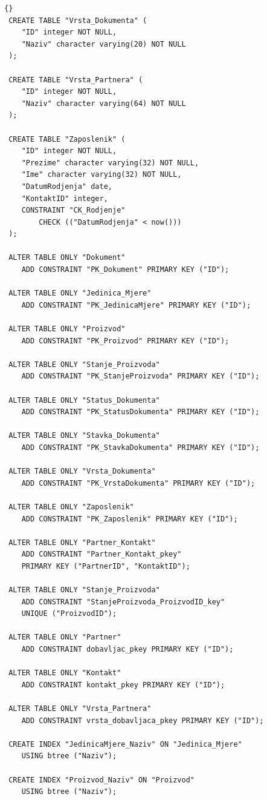 \documentclass[a4paper,12pt]{foi}
\begin{document}
\begin{lstlisting}[frame=tb]{}
 CREATE TABLE "Vrsta_Dokumenta" (
    "ID" integer NOT NULL,
    "Naziv" character varying(20) NOT NULL
 );
 
 CREATE TABLE "Vrsta_Partnera" (
    "ID" integer NOT NULL,
    "Naziv" character varying(64) NOT NULL
 );
 
 CREATE TABLE "Zaposlenik" (
    "ID" integer NOT NULL,
    "Prezime" character varying(32) NOT NULL,
    "Ime" character varying(32) NOT NULL,
    "DatumRodjenja" date,
    "KontaktID" integer,
    CONSTRAINT "CK_Rodjenje" 
    	CHECK (("DatumRodjenja" < now()))
 );
 
 ALTER TABLE ONLY "Dokument"
    ADD CONSTRAINT "PK_Dokument" PRIMARY KEY ("ID");

 ALTER TABLE ONLY "Jedinica_Mjere"
    ADD CONSTRAINT "PK_JedinicaMjere" PRIMARY KEY ("ID");

 ALTER TABLE ONLY "Proizvod"
    ADD CONSTRAINT "PK_Proizvod" PRIMARY KEY ("ID");

 ALTER TABLE ONLY "Stanje_Proizvoda"
    ADD CONSTRAINT "PK_StanjeProizvoda" PRIMARY KEY ("ID");

 ALTER TABLE ONLY "Status_Dokumenta"
    ADD CONSTRAINT "PK_StatusDokumenta" PRIMARY KEY ("ID");

 ALTER TABLE ONLY "Stavka_Dokumenta"
    ADD CONSTRAINT "PK_StavkaDokumenta" PRIMARY KEY ("ID");

 ALTER TABLE ONLY "Vrsta_Dokumenta"
    ADD CONSTRAINT "PK_VrstaDokumenta" PRIMARY KEY ("ID");

 ALTER TABLE ONLY "Zaposlenik"
    ADD CONSTRAINT "PK_Zaposlenik" PRIMARY KEY ("ID");
	
 ALTER TABLE ONLY "Partner_Kontakt"
    ADD CONSTRAINT "Partner_Kontakt_pkey" 
    PRIMARY KEY ("PartnerID", "KontaktID");

 ALTER TABLE ONLY "Stanje_Proizvoda"
    ADD CONSTRAINT "StanjeProizvoda_ProizvodID_key" 
    UNIQUE ("ProizvodID");

 ALTER TABLE ONLY "Partner"
    ADD CONSTRAINT dobavljac_pkey PRIMARY KEY ("ID");
	
 ALTER TABLE ONLY "Kontakt"
    ADD CONSTRAINT kontakt_pkey PRIMARY KEY ("ID");

 ALTER TABLE ONLY "Vrsta_Partnera"
    ADD CONSTRAINT vrsta_dobavljaca_pkey PRIMARY KEY ("ID");

 CREATE INDEX "JedinicaMjere_Naziv" ON "Jedinica_Mjere" 
 	USING btree ("Naziv");

 CREATE INDEX "Proizvod_Naziv" ON "Proizvod" 
 	USING btree ("Naziv");


\end{lstlisting}
\end{document}
